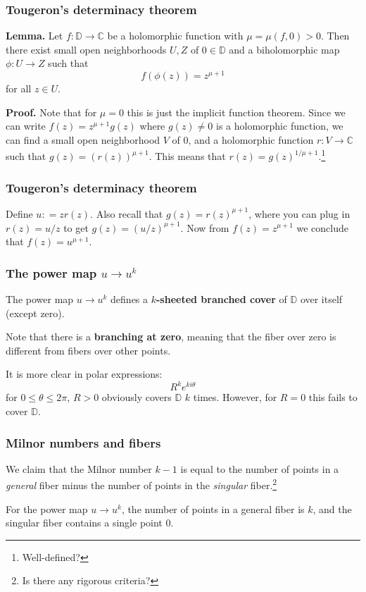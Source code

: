 \documentclass{beamer}
\begin{document}
\begin{frame}
\frametitle{Tougeron's determinacy theorem}

\textbf{Lemma.} Let $f: \mathbb{D} \to \mathbb{C}$ be a holomorphic function with $\mu = \mu(f,0) > 0$. Then there exist small open neighborhoods $U,Z$ of $0 \in \mathbb{D}$ and a biholomorphic map $\phi: U \to Z$ such that \[f(\phi(z)) = z^{\mu + 1}\] for all $z \in U$.

\phantom{?}

\textbf{Proof.} Note that for $\mu = 0$ this is just the implicit function theorem. Since we can write $f(z) = z^{\mu + 1}g(z)$ where $g(z) \neq 0$ is a holomorphic function, we can find a small open neighborhood $V$ of $0$, and a holomorphic function $r : V \to \mathbb{C}$ such that $g(z) = (r(z))^{\mu + 1}$. This means that $r(z) = g(z)^{1/\mu+1}$.\footnote{Well-defined?}

\end{frame}


\begin{frame}
\frametitle{Tougeron's determinacy theorem}

Define $u : = zr(z)$. Also recall that $g(z) = r(z)^{\mu+1}$, where you can plug in $r(z) = u/z$ to get $g(z) = (u/z)^{\mu+1}$. Now from $f(z) = z^{\mu+1}$ we conclude that $f(z) = u^{\mu+1}$.

\end{frame}


\begin{frame}
\frametitle{The power map $u \to u^k$}

The power map $u \to u^k$ defines a $k$\textbf{-sheeted branched cover} of $\mathbb{D}$ over itself (except zero).

\phantom{?}

Note that there is a \textbf{branching at zero}, meaning that the fiber over zero is different from fibers over other points.

\phantom{?}

It is more clear in polar expressions: \[R^k e^{ki\theta}\] for $0 \leq \theta \leq 2\pi$, $R>0$ obviously covers $\mathbb{D}$ $k$ times. However, for $R=0$ this fails to cover $\mathbb{D}$.

\end{frame}

\begin{frame}
\frametitle{Milnor numbers and fibers}

We claim that the Milnor number $k-1$ is equal to the number of points in a \textit{general} fiber minus the number of points in the \textit{singular} fiber.\footnote{Is there any rigorous criteria?}

\phantom{?}

For the power map $u \to u^k$, the number of points in a general fiber is $k$, and the singular fiber contains a single point $0$.

\end{frame}
\end{document}

